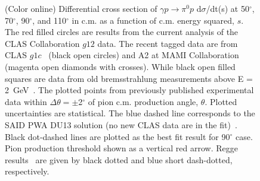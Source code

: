 \documentclass[aps,prc,twocolumn,floatfix,showpacs,preprintnumbers,amsmath,amssymb,superscriptaddress]{revtex4-1}
\begin{document}
\begin{figure}[htb!]
        \caption {(Color online) Differential cross section of 
		$\gamma p\to\pi^0p$ d$\sigma$/dt(s) at 
		50$^\circ$, 70$^\circ$, 90$^\circ$, and 
		110$^\circ$ in c.m. as a function of c.m. 
		energy squared, $s$. The red filled circles are 
		results from the current analysis of the CLAS 
		Collaboration $g12$ data. The recent tagged data 
		are from CLAS $g1c$~\protect\cite{du07} (black 
		open circles) and A2 at MAMI 
		Collaboration~\protect\cite{mami} (magenta open 
		diamonds with crosses). While black open filled 
		squares are data from old bremsstrahlung
		measurements above E = 2~GeV~\protect\cite{brem}. 
		The plotted points from previously published 
		experimental data within $\Delta\theta =
		\pm$2$^\circ$ of pion c.m. production angle, 
		$\theta$.  Plotted uncertainties are statistical.  
		The blue dashed line corresponds to the SAID PWA 
		DU13 solution (no new CLAS data are in the 
		fit)~\protect\cite{du13}.  Black dot-dashed lines 
		are plotted as the best fit result for
		90$^\circ$ case. Pion production threshold shown 
		as a vertical red arrow. Regge 
		results~\protect\cite{Goldstein,Laget} are given 
		by black dotted and blue short dash-dotted, 
		respectively.} \label{fig:scaling}
\end{figure}
\end{document}

